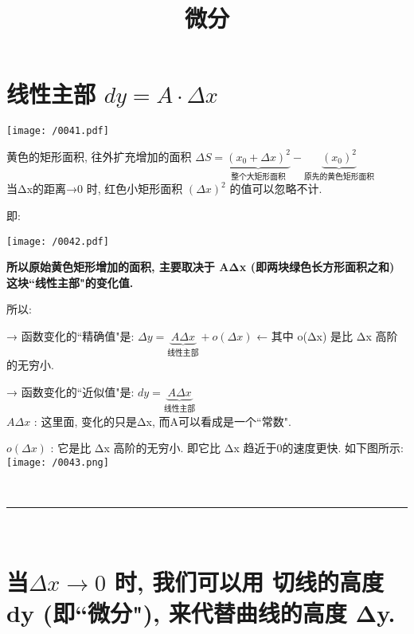 \documentclass[UTF8]{ctexart}
\title{微分}
\begin{document}
	\tableofcontents %
	\date{} %
	\maketitle  %
	
	
	\section{线性主部 $dy= A \cdot \varDelta x $}
	
	\texttt{[image: /0041.pdf]} 
	
	
	黄色的矩形面积, 往外扩充增加的面积 
	$ 	
	\varDelta S =\underset{\text{整个大矩形面积}}{\underbrace{\left( x_0+\varDelta x \right) ^2}}-\underset{\text{原先的黄色矩形面积}}{\underbrace{\left( x_0 \right) ^2}}
	$ \\
	
	当Δx的距离→0 时, 红色小矩形面积 $(\Delta x)^2$ 的值可以忽略不计.
	
	即:
	
	\texttt{[image: /0042.pdf]}
	
	\textbf{所以原始黄色矩形增加的面积, 主要取决于 AΔx (即两块绿色长方形面积之和) 这块``线性主部"的变化值.}
	
	所以:
	
	→ 函数变化的``精确值"是: $\varDelta y=\underset{\text{线性主部}}{\underbrace{A\varDelta x}}+ o\left( \varDelta x \right)  $ ← 其中 o(Δx) 是比 Δx 高阶的无穷小.
	
	→ 函数变化的``近似值"是: $dy=\underset{\text{线性主部}}{\underbrace{A\varDelta x}} $ \\
	
	$A \Delta x$ : 这里面, 变化的只是Δx, 而A可以看成是一个``常数".
	
	$o\left( \varDelta x \right) $ : 它是比 Δx 高阶的无穷小. 即它比 Δx 趋近于0的速度更快. 如下图所示: \\
	
	\texttt{[image: /0043.png]}
	
	
	
	
	
	~\\
	\hrule
	~\\
	
	
	
	\section{当$\varDelta x \rightarrow 0 $ 时, 我们可以用 切线的高度 dy (即``微分"), 来代替曲线的高度 Δy.}
	
\end{document}
